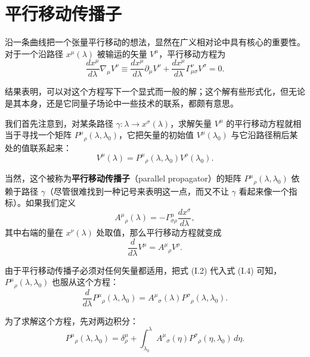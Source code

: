 \chapter{平行移动传播子}

沿一条曲线把一个张量平行移动的想法，显然在广义相对论中具有核心的重要性。对于一个沿路径 $x^\mu(\lambda)$ 被输运的矢量 $V^\mu$，平行移动方程为
\begin{equation*}
\frac{dx^\mu}{d\lambda}\nabla_\mu V^\nu \equiv \frac{dx^\mu}{d\lambda}\partial_\mu V^\nu + \frac{dx^\mu}{d\lambda}\Gamma^\nu_{\mu\sigma}V^\sigma = 0.
\tag{I.1}
\end{equation*}

结果表明，可以对这个方程写下一个显式而一般的解；这个解有些形式化，但无论是其本身，还是它同量子场论中一些技术的联系，都颇有意思。

我们首先注意到，对某条路径 $\gamma:\lambda\to x^\sigma(\lambda)$，求解矢量 $V^\mu$ 的平行移动方程就相当于寻找一个矩阵 $P^\mu{}_\rho(\lambda,\lambda_0)$，它把矢量的初始值 $V^\mu(\lambda_0)$ 与它沿路径稍后某处的值联系起来：
\begin{equation*}
V^\mu(\lambda) = P^\mu{}_\rho(\lambda,\lambda_0)V^\rho(\lambda_0).
\tag{I.2}
\end{equation*}

当然，这个被称为\textbf{平行移动传播子}（parallel propagator）的矩阵 $P^\mu{}_\rho(\lambda,\lambda_0)$ 依赖于路径 $\gamma$（尽管很难找到一种记号来表明这一点，而又不让 $\gamma$ 看起来像一个指标）。如果我们定义
\begin{equation*}
A^\mu{}_\rho(\lambda) = -\Gamma^\mu_{\sigma\rho}\frac{dx^\sigma}{d\lambda},
\tag{I.3}
\end{equation*}
其中右端的量在 $x^\nu(\lambda)$ 处取值，那么平行移动方程就变成
\begin{equation*}
\frac{d}{d\lambda}V^\mu = A^\mu{}_\rho V^\rho.
\tag{I.4}
\end{equation*}

由于平行移动传播子必须对任何矢量都适用，把式 (I.2) 代入式 (I.4) 可知，$P^\mu{}_\rho(\lambda,\lambda_0)$ 也服从这个方程：
\begin{equation*}
\frac{d}{d\lambda}P^\mu{}_\rho(\lambda,\lambda_0) = A^\mu{}_\sigma(\lambda)P^\sigma{}_\rho(\lambda,\lambda_0).
\tag{I.5}
\end{equation*}

为了求解这个方程，先对两边积分：
\begin{equation*}
P^\mu{}_\rho(\lambda,\lambda_0) = \delta^\mu_\rho + \int_{\lambda_0}^{\lambda} A^\mu{}_\sigma(\eta)P^\sigma{}_\rho(\eta,\lambda_0)\,d\eta.
\tag{I.6}
\end{equation*}

